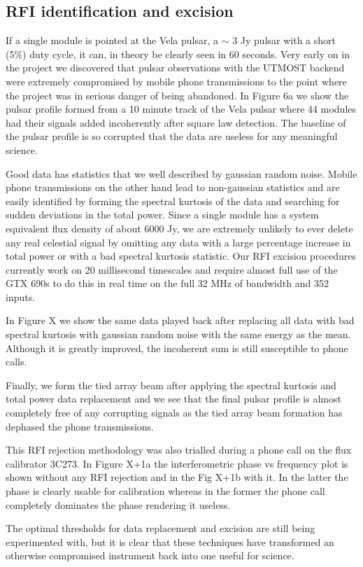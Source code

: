 \subsection{RFI identification and excision}

If a single module is pointed at the Vela pulsar, a $\sim$ 3 Jy pulsar with a short (5\%) duty cycle, it can, in theory be clearly seen in 60 seconds. Very early on in the project we discovered that pulsar observations with the UTMOST backend were extremely compromised by mobile phone transmissions to the point where the project was in serious danger of being abandoned. In Figure 6a we show the pulsar profile formed from a 10 minute track of the Vela pulsar where 44 modules had their signals added incoherently after square law detection. The baseline of the pulsar profile is so corrupted that the data are useless for any meaningful science.

Good data has statistics that we well described by gaussian random noise. Mobile phone transmissions on the other hand lead to non-gaussian statistics and are easily identified by forming the spectral kurtosis of the data and searching for sudden deviations in the total power. Since a single module has a system equivalent flux density of about 6000 Jy, we are extremely unlikely to ever delete any real celestial signal by omitting any data with a large percentage increase in total power or with a bad spectral kurtosis statistic. Our RFI excision procedures currently work on 20 millisecond timescales and require almost full use of the GTX 690s to do this in real time on the full 32 MHz of bandwidth and 352 inputs.

In Figure X we show the same data played back after replacing all data with bad spectral kurtosis with gaussian random noise with the same energy as the mean. Although it is greatly improved, the incoherent sum is still susceptible to phone calls.

Finally, we form the tied array beam after applying the spectral kurtosis and total power data replacement and we see that the final pulsar profile is almost completely free of any corrupting signals as the tied array beam formation has dephased the phone transmissions.

This RFI rejection methodology was also trialled during a phone call on the flux calibrator 3C273. In Figure X+1a the interferometric phase vs frequency plot is shown without any RFI rejection and in the Fig X+1b with it. In the latter the phase is clearly usable for calibration whereas in the former the phone call completely dominates the phase rendering it useless.

The optimal thresholds for data replacement and excision are still being experimented with, but it is clear that these techniques have transformed an otherwise compromised instrument back into one useful for science.



